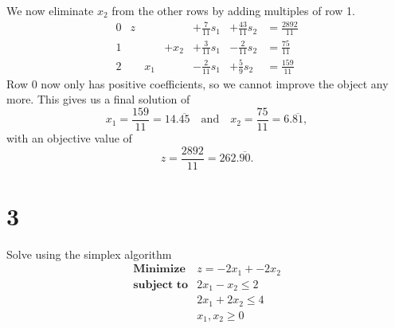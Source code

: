 \documentclass[12pt]{article}
\newenvironment{problem}
    {\begin{lrbox}{\mybox}\begin{minipage}{0.98\textwidth}}
    {\end{minipage}\end{lrbox}\begin{center}\framebox[\textwidth]{\usebox{\mybox}}\end{center}}
\theoremstyle{definition}
\newcommand{\isp}[1]{\quad\text{#1}\quad}
\begin{document}
We now eliminate $x_2$ from the other rows by adding multiples of row 1.
\[\begin{array}{rrrrrrl}
    0 & z &  &  & +\frac{7}{11}s_1 & +\frac{43}{11}s_2 & = \frac{2892}{11} \\
    1 &   &  & +x_2 & +\frac{3}{11}s_1 & -\frac{2}{11}s_2 & = \frac{75}{11} \\
    2 &   & x_1 &  & -\frac{2}{11}s_1 & +\frac59 s_2 & = \frac{159}{11}
\end{array}\]
Row 0 now only has positive coefficients, so we cannot improve the object any more. This gives us a final solution of
\[
    x_1 = \frac{159}{11} = 14.\overline{45} \isp{and} x_2 = \frac{75}{11} = 6.\overline{81},
\]
with an objective value of
\[
    z = \frac{2892}{11} = 262.\overline{90}.
\]

\newpage
\section*{3}
\begin{problem}
    Solve using the simplex algorithm
    \[
        \begin{array}{ll}
            \textbf{Minimize} & z = -2x_1 + -2x_2 \\
            \textbf{subject to} & 2x_1 - x_2 \leq 2 \\
                & 2x_1 + 2x_2 \leq 4 \\
                & x_1, x_2 \geq 0
        \end{array}
    \]
\end{problem}
\end{document}
